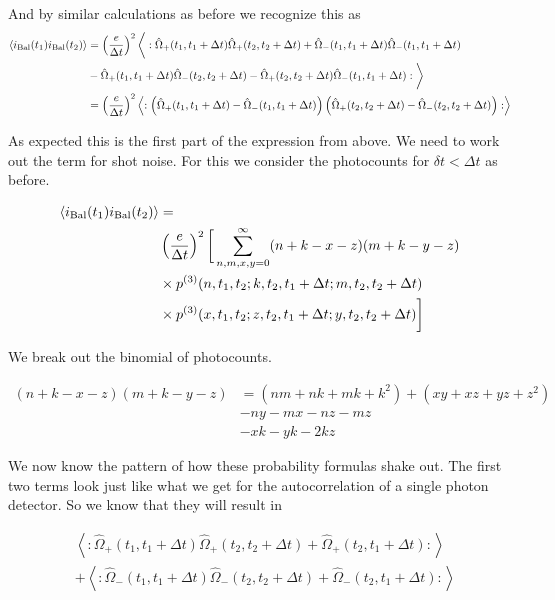 \documentclass[12pt]{article}
\begin{document}
And by similar calculations as before we recognize this as
\begin{align}
\braket{i_{\text{Bal}}(t_1)i_{\text{Bal}}(t_2)} &= \left(\frac{e}{\Delta t}\right)^2 \bigg<: \hat{\Omega}_{+}(t_1,t_1+\Delta t) \hat{\Omega}_{+}(t_2,t_2+\Delta t) + \hat{\Omega}_{-}(t_1,t_1+\Delta t) \hat{\Omega}_{-}(t_1,t_1+\Delta t)\\
&-\hat{\Omega}_+(t_1,t_1+\Delta t)\hat{\Omega}_-(t_2,t_2+\Delta t) - \hat{\Omega}_+(t_2,t_2+\Delta t) \hat{\Omega}_-(t_1,t_1+\Delta t):\bigg>\\
&= \left(\frac{e}{\Delta t}\right)^2 \left<:\left(\hat{\Omega}_+(t_1,t_1+\Delta t) - \hat{\Omega}_-(t_1,t_1+\Delta t)\right)\left(\hat{\Omega}_+(t_2,t_2+ \Delta t) - \hat{\Omega}_-(t_2,t_2+\Delta t)\right):\right>
\end{align}

As expected this is the first part of the expression from above. We need to work out the term for shot noise. For this we consider the photocounts for $\delta t<\Delta t$ as before.

\begin{align}
\braket{i_{\text{Bal}}(t_1)i_{\text{Bal}}(t_2)} &= \\
&\left(\frac{e}{\Delta t}\right)^2 \bigg[ \sum_{n,m,x,y=0}^{\infty} (n+k-x-z)(m+k-y-z)\\
&\times p^{(3)}(n,t_1,t_2;k,t_2,t_1+\Delta t;m,t_2,t_2+\Delta t)\\
&\times p^{(3)}(x,t_1,t_2;z,t_2,t_1+\Delta t;y,t_2,t_2+\Delta t)\bigg]\\
\end{align}

We break out the binomial of photocounts.

\begin{align}
(n+k-x-z)(m+k-y-z) &= (nm + nk + mk + k^2) + (xy + xz + yz + z^2)\\
& - ny - mx - nz - mz\\
& -xk - yk - 2kz
\end{align}

We now know the pattern of how these probability formulas shake out. The first two terms look just like what we get for the autocorrelation of a single photon detector. So we know that they will result in

\begin{align}
&\left<: \hat{\Omega}_+(t_1,t_1+\Delta t)\hat{\Omega}_+(t_2,t_2+\Delta t) + \hat{\Omega}_+(t_2,t_1+\Delta t):\right>\\
&+\left<: \hat{\Omega}_-(t_1,t_1+\Delta t)\hat{\Omega}_-(t_2,t_2+\Delta t) + \hat{\Omega}_-(t_2,t_1+\Delta t):\right>
\end{align}
\end{document}
